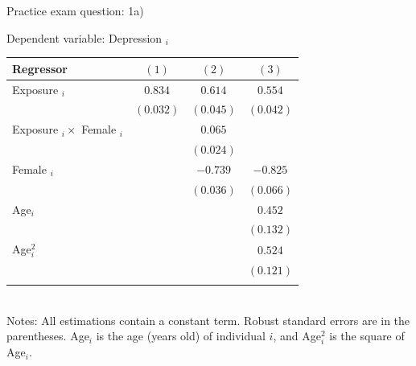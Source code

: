 \documentclass[11pt]{beamer}
\begin{document}
\begin{frame}{Practice exam question: 1a)}

\footnotesize
Dependent variable: Depression $_i$

\begin{tabular}{lccc}
\toprule
\textbf{Regressor}               & \textbf{$(1)$}       & $(2)$ & $(3)$                         \\
\midrule
Exposure $_i$                    & $0.834$              & $0.614$                                                   & $0.554$                       \\
                                 & $(0.032)$            & $(0.045)$                                                 & $(0.042)$                     \\
Exposure $_i \times$ Female $_i$ &                      & $0.065$                                                   &                               \\
                                 &                      & $(0.024)$                                                 &                               \\
Female $_i$                      &                      & $-0.739$                                                  & $-0.825$                      \\
                                 &                      & $(0.036)$                                                 & $(0.066)$                     \\
Age$_{i}$                        &                      &                                                           & $0.452$                       \\
                                 &                      &                                                           & $(0.132)$                     \\
Age$_i^2$    &                      &                                                           & $0.524$                       \\
                                 & \multicolumn{1}{l}{} & \multicolumn{1}{l}{}                                      & \multicolumn{1}{l}{$(0.121)$} \\
                                 \bottomrule \\
\end{tabular}  \\

Notes: All estimations contain a constant term. Robust standard errors are in the parentheses. Age$_i$ is the age (years old) of individual $i$, and Age$_i^2$ is the square of Age$_i$.

\end{frame}
\end{document}
